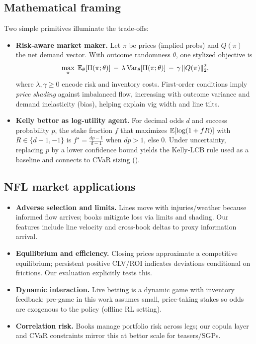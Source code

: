 \subsection{Mathematical framing}
Two simple primitives illuminate the trade‑offs:
\begin{itemize}
  \item \textbf{Risk‑aware market maker.} Let $\pi$ be prices (implied probs) and $Q(\pi)$ the net demand vector. With outcome randomness $\theta$, one stylized objective is
  \[
  \max_{\pi}\; \mathbb{E}_\theta[\Pi(\pi;\theta)]\,-\,\lambda\,\mathrm{Var}_\theta[\Pi(\pi;\theta)]\,-\,\gamma\,\|Q(\pi)\|_2^2,
  \]
  where $\lambda,\gamma\ge 0$ encode risk and inventory costs. First‑order conditions imply \emph{price shading} against imbalanced flow, increasing with outcome variance and demand inelasticity (bias), helping explain vig width and line tilts.
  \item \textbf{Kelly bettor as log‑utility agent.} For decimal odds $d$ and success probability $p$, the stake fraction $f$ that maximizes $\mathbb{E}[\log(1+fR)]$ with $R\in\{d-1,-1\}$ is $f^\star=\tfrac{dp-1}{d-1}$ when $dp>1$, else $0$. Under uncertainty, replacing $p$ by a lower confidence bound yields the Kelly‑LCB rule used as a baseline and connects to CVaR sizing ().
\end{itemize}

\subsection{NFL market applications}
\begin{itemize}
  \item \textbf{Adverse selection and limits.} Lines move with injuries/weather because informed flow arrives; books mitigate loss via limits and shading. Our features include line velocity and cross‑book deltas to proxy information arrival.
  \item \textbf{Equilibrium and efficiency.} Closing prices approximate a competitive equilibrium; persistent positive CLV/ROI indicates deviations conditional on frictions. Our evaluation explicitly tests this.
  \item \textbf{Dynamic interaction.} Live betting is a dynamic game with inventory feedback; pre‑game in this work assumes small, price‑taking stakes so odds are exogenous to the policy (offline RL setting).
  \item \textbf{Correlation risk.} Books manage portfolio risk across legs; our copula layer and CVaR constraints mirror this at bettor scale for teasers/SGPs.
\end{itemize}

